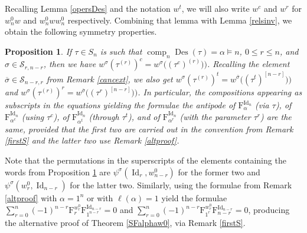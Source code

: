\documentclass{article}
\newtheorem{prop}[thm]{Proposition}
\theoremstyle{definition}
\begin{document}
Recalling Lemma \ref{opersDes} and the notation $w^{t}$, we will also write $w^{c}$ and $w^{r}$ for $w^{0}_{n}w$ and $w^{0}_{n}ww^{0}_{n}$ respectively. Combining that lemma with Lemma \ref{relsinv}, we obtain the following symmetry properties.
\begin{prop}
If $\tau \in S_{n}$ is such that $\operatorname{comp}_{n}\operatorname{Des}(\tau)=\alpha \vDash n$, $0 \leq r \leq n$, and $\sigma\in\mathcal{S}_{r,n-r}$, then we have $w^{\sigma}(\tau^{(r)})^{c}=w^{\sigma}\big((\tau^{c})^{(r)})\big)$. Recalling the element $\overline{\sigma}\in\mathcal{S}_{n-r,r}$ from Remark \ref{cancext}, we also get $w^{\sigma}(\tau^{(r)})^{t}=w^{\overline{\sigma}}\big((\tau^{t})^{[n-r]})\big)$ and $w^{\sigma}(\tau^{(r)})^{r}=w^{\overline{\sigma}}\big((\tau^{r})^{[n-r]})\big)$. In particular, the compositions appearing as subscripts in the equations yielding the formulae the antipode of $\mathrm{F}_{\alpha}^{\operatorname{Id}_{n}}$ (via $\tau$), of $\mathrm{F}_{\alpha^{c}}^{\operatorname{Id}_{n}}$ (using $\tau^{c}$), of $\mathrm{F}_{\alpha^{t}}^{\operatorname{Id}_{n}}$ (through $\tau^{t}$), and of $\mathrm{F}_{\alpha^{r}}^{\operatorname{Id}_{n}}$ (with the parameter $\tau^{r}$) are the same, provided that the first two are carried out in the convention from Remark \ref{firstS} and the latter two use Remark \ref{altproof}. \label{symeq}
\end{prop}
Note that the permutations in the superscripts of the elements containing the words from Proposition \ref{symeq} are $\psi^{\sigma}(\operatorname{Id}_{r},w^{0}_{n-r})$ for the former two and $\psi^{\sigma}(w^{0}_{r},\operatorname{Id}_{n-r})$ for the latter two. Similarly, using the formulae from Remark \ref{altproof} with $\alpha=1^{n}$ or with $\ell(\alpha)=1$ yield the formulae $\sum_{r=0}^{n}(-1)^{n-r}\mathrm{F}_{r}^{w^{0}_{r}}\mathrm{F}_{1^{n-r}}^{\operatorname{Id}_{n-r}}=0$ and $\sum_{r=0}^{n}(-1)^{n-r}\mathrm{F}_{1^{r}}^{w^{0}_{r}}\mathrm{F}_{n-r}^{\operatorname{Id}_{n-r}}=0$, producing the alternative proof of Theorem \ref{SFalphaw0}, via Remark \ref{firstS}.

\medskip
\end{document}

